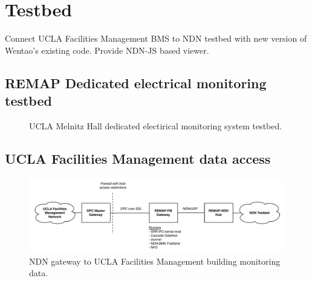 \section{Testbed}

Connect UCLA Facilities Management BMS to NDN testbed with new version of Wentao’s existing code. Provide NDN-JS based viewer. 

\subsection{REMAP Dedicated electrical monitoring testbed}

\begin{figure}
\centering
{}
\caption{UCLA Melnitz Hall dedicated electirical monitoring system testbed.}
\label{fig:melnitz}
\end{figure}


\subsection{UCLA Facilities Management data access}

\begin{figure}
\begin{center}
\includegraphics[width=1\textwidth]{figures/NDN-EBAMS-INTERFACE}
\caption{{NDN gateway to UCLA Facilities Management building monitoring data.}}
\label{fig:ucla-ebams-testbed}
\end{center}
\end{figure}


